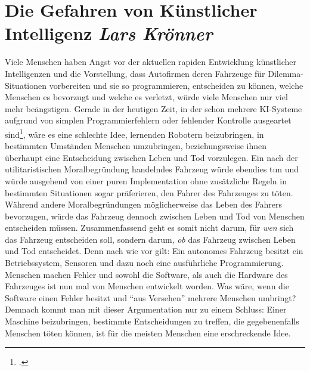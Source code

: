 \documentclass[a4paper, 12pt, openany]{book}
\newcommand\Section[2]{\section[#1 {\scriptsize\itshape#2}]{#1 \footnotesize\itshape#2}}
\begin{document}
        \Section{Die Gefahren von Künstlicher Intelligenz}{Lars Krönner}
            Viele Menschen haben Angst vor der aktuellen rapiden Entwicklung künstlicher Intelligenzen und die Vorstellung, dass Autofirmen deren Fahrzeuge für Dilemma-Situationen vorbereiten und sie so programmieren, entscheiden zu können, welche Menschen es bevorzugt und welche es verletzt, würde viele Menschen nur viel mehr beängstigen. Gerade in der heutigen Zeit, in der schon mehrere KI-Systeme aufgrund von simplen Programmierfehlern oder fehlender Kontrolle ausgeartet sind\footcite{welt2016facebook}, wäre es eine schlechte Idee, lernenden Robotern beizubringen, in bestimmten Umständen Menschen umzubringen, beziehungsweise ihnen überhaupt eine Entscheidung zwischen Leben und Tod vorzulegen. Ein nach der utilitaristischen Moralbegründung handelndes Fahrzeug würde ebendies tun und würde ausgehend von einer puren Implementation ohne zusätzliche Regeln in bestimmten Situationen sogar präferieren, den Fahrer des Fahrzeuges zu töten. Während andere Moralbegründungen möglicherweise das Leben des Fahrers bevorzugen, würde das Fahrzeug dennoch zwischen Leben und Tod von Menschen entscheiden müssen. Zusammenfassend geht es somit nicht darum, für \textit{wen} sich das Fahrzeug entscheiden soll, sondern darum, \textit{ob} das Fahrzeug zwischen Leben und Tod entscheidet. Denn nach wie vor gilt: Ein autonomes Fahrzeug besitzt ein Betriebssystem, Sensoren und dazu noch eine ausführliche Programmierung. Menschen machen Fehler und sowohl die Software, als auch die Hardware des Fahrzeuges ist nun mal von Menschen entwickelt worden. Was wäre, wenn die Software einen Fehler besitzt und \enquote{aus Versehen} mehrere Menschen umbringt? Demnach kommt man mit dieser Argumentation nur zu einem Schluss: Einer Maschine beizubringen, bestimmte Entscheidungen zu treffen, die gegebenenfalls Menschen töten können, ist für die meisten Menschen eine erschreckende Idee.
        
\end{document}
